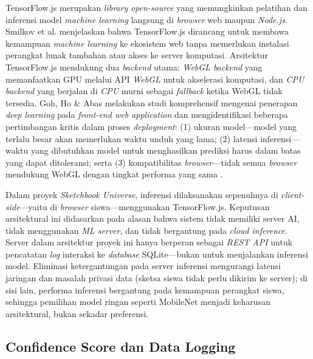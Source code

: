 \documentclass[12pt,a4paper,oneside,openany]{report}
\begin{document}
TensorFlow.js merupakan \textit{library} \textit{open-source} yang memungkinkan pelatihan dan inferensi model \textit{machine learning} langsung di \textit{browser} web maupun \textit{Node.js}. Smilkov et al. \cite{ref8} menjelaskan bahwa TensorFlow.js dirancang untuk membawa kemampuan \textit{machine learning} ke ekosistem web tanpa memerlukan instalasi perangkat lunak tambahan atau akses ke server komputasi. Arsitektur TensorFlow.js mendukung dua \textit{backend} utama: \textit{WebGL backend} yang memanfaatkan GPU melalui API \textit{WebGL} untuk akselerasi komputasi, dan \textit{CPU backend} yang berjalan di \textit{CPU} murni sebagai \textit{fallback} ketika WebGL tidak tersedia. Goh, Ho \& Abas \cite{ref7} melakukan studi komprehensif mengenai penerapan \textit{deep learning} pada \textit{front-end web application} dan mengidentifikasi beberapa pertimbangan kritis dalam proses \textit{deployment}: (1) ukuran model---model yang terlalu besar akan memerlukan waktu unduh yang lama; (2) latensi inferensi---waktu yang dibutuhkan model untuk menghasilkan prediksi harus dalam batas yang dapat ditoleransi; serta (3) kompatibilitas \textit{browser}---tidak semua \textit{browser} mendukung WebGL dengan tingkat performa yang sama \cite{ref7}.

Dalam proyek \textit{Sketchbook Universe}, inferensi dilaksanakan sepenuhnya di \textit{client-side}---yaitu di \textit{browser} siswa---menggunakan TensorFlow.js. Keputusan arsitektural ini didasarkan pada alasan bahwa sistem tidak memiliki server AI, tidak menggunakan \textit{ML server}, dan tidak bergantung pada \textit{cloud inference}. Server dalam arsitektur proyek ini hanya berperan sebagai \textit{REST API} untuk pencatatan \textit{log} interaksi ke \textit{database} SQLite---bukan untuk menjalankan inferensi model. Eliminasi ketergantungan pada server inferensi mengurangi latensi jaringan dan masalah privasi data (sketsa siswa tidak perlu dikirim ke server); di sisi lain, performa inferensi bergantung pada kemampuan perangkat siswa, sehingga pemilihan model ringan seperti MobileNet menjadi keharusan arsitektural, bukan sekadar preferensi.

\subsection{Confidence Score dan Data Logging}
\label{subsec:confidence-logging}
\end{document}
